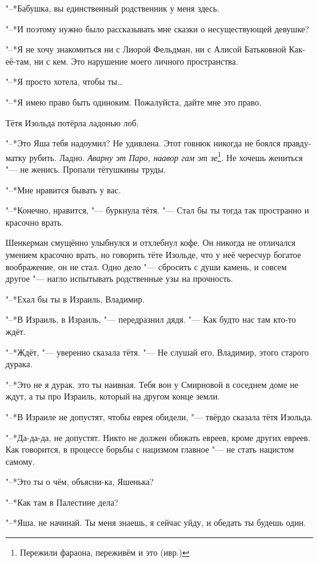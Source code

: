 "--*Бабушка, вы единственный родственник у меня здесь.

"--*И поэтому нужно было рассказывать мне сказки о несуществующей девушке?

"--*Я не хочу знакомиться ни с Лиорой Фельдман, ни с Алисой Батьковной Как-её-там, ни с кем.
Это нарушение моего личного пространства.

"--*Я просто хотела, чтобы ты\ldots{}

"--*Я имею право быть одиноким.
Пожалуйста, дайте мне это право.

Тётя Изольда потёрла ладонью лоб.

"--*Это Яша тебя надоумил?
Не удивлена.
Этот говнюк никогда не боялся правду-матку рубить.
Ладно.
\textit{Аварну эт Паро, наавор гам эт зе}\footnote{Пережили фараона, переживём и это (ивр.)}.
Не хочешь жениться "--- не женись.
Пропали тётушкины труды.

"--*Мне нравится бывать у вас.

"--*Конечно, нравится, "--- буркнула тётя.
"--- Стал бы ты тогда так пространно и красочно врать.

Шенкерман смущённо улыбнулся и отхлебнул кофе.
Он никогда не отличался умением красочно врать, но говорить тёте Изольде, что у неё чересчур богатое воображение, он не стал.
Одно дело "--- сбросить с души камень, и совсем другое "--- нагло испытывать родственные узы на прочность.

\textspace

"--*Ехал бы ты в Израиль, Владимир.

"--*В Израиль, в Израиль, "--- передразнил дядя.
"--- Как будто нас там кто-то ждёт.

"--*Ждёт, "--- уверенно сказала тётя.
"--- Не слушай его, Владимир, этого старого дурака.

"--*Это не я дурак, это ты наивная.
Тебя вон у Смирновой в соседнем доме не ждут, а ты про Израиль, который на другом конце земли.

"--*В Израиле не допустят, чтобы еврея обидели, "--- твёрдо сказала тётя Изольда.

"--*Да-да-да, не допустят.
Никто не должен обижать евреев, кроме других евреев.
Как говорится, в процессе борьбы с нацизмом главное "--- не стать нацистом самому.

"--*Это ты о чём, объясни-ка, Яшенька?

"--*Как там в Палестине дела?

"--*Яша, не начинай.
Ты меня знаешь, я сейчас уйду, и обедать ты будешь один.

